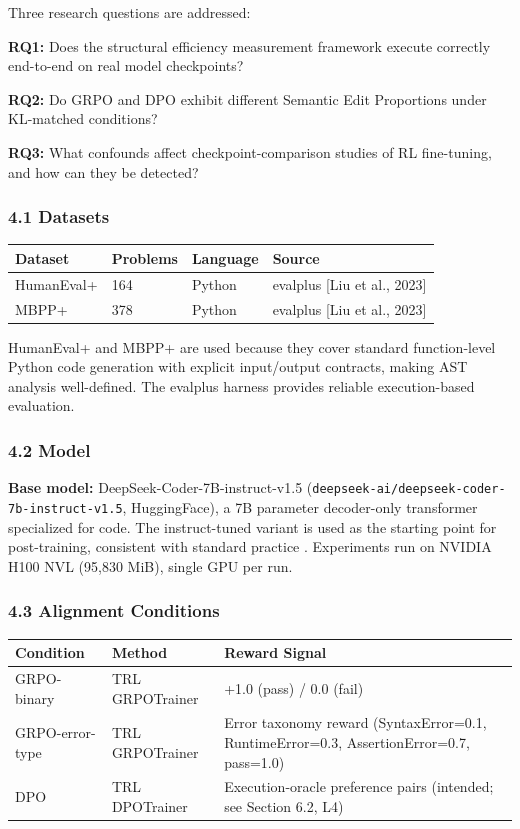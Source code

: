
Three research questions are addressed:

\textbf{RQ1:} Does the structural efficiency measurement framework execute correctly end-to-end on real model checkpoints?

\textbf{RQ2:} Do GRPO and DPO exhibit different Semantic Edit Proportions under KL-matched conditions?

\textbf{RQ3:} What confounds affect checkpoint-comparison studies of RL fine-tuning, and how can they be detected?

\subsubsection{4.1 Datasets}

\begin{table}[htbp]
\centering
\begin{tabular}{llll}
\toprule
Dataset & Problems & Language & Source \\
\midrule
HumanEval+ & 164 & Python & evalplus [Liu et al., 2023] \\
MBPP+ & 378 & Python & evalplus [Liu et al., 2023] \\
\bottomrule
\end{tabular}
\end{table}

HumanEval+ and MBPP+ are used because they cover standard function-level Python code generation with explicit input/output contracts, making AST analysis well-defined. The evalplus harness provides reliable execution-based evaluation.

\subsubsection{4.2 Model}

\textbf{Base model:} DeepSeek-Coder-7B-instruct-v1.5 (\texttt{deepseek-ai/deepseek-coder-7b-instruct-v1.5}, HuggingFace), a 7B parameter decoder-only transformer specialized for code. The instruct-tuned variant is used as the starting point for post-training, consistent with standard practice \citep{Lambertetal2024}. Experiments run on NVIDIA H100 NVL (95,830 MiB), single GPU per run.

\subsubsection{4.3 Alignment Conditions}

\begin{table}[htbp]
\centering
\begin{tabular}{lll}
\toprule
Condition & Method & Reward Signal \\
\midrule
GRPO-binary & TRL GRPOTrainer & +1.0 (pass) / 0.0 (fail) \\
GRPO-error-type & TRL GRPOTrainer & Error taxonomy reward (SyntaxError=0.1, RuntimeError=0.3, AssertionError=0.7, pass=1.0) \\
DPO & TRL DPOTrainer & Execution-oracle preference pairs (intended; see Section 6.2, L4) \\
\bottomrule
\end{tabular}
\end{table}

